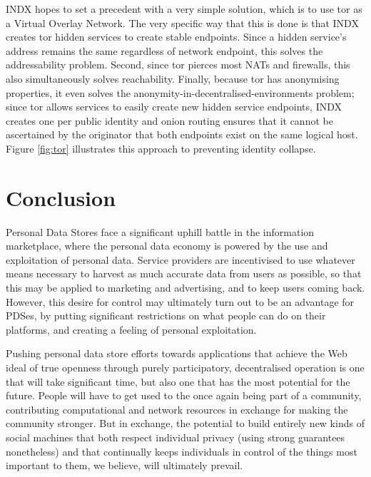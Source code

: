 \documentclass{sig-alternate}
\begin{document}
INDX hopes to set a precedent with a very simple solution, which is to use tor as a Virtual Overlay Network.  The very specific way that this is done is that INDX creates tor hidden services to create stable endpoints. Since a hidden service's address remains the same regardless of network endpoint, this solves the addressability problem. Second, since tor pierces most NATs and firewalls, this also simultaneously solves reachability.  Finally, because tor has anonymising properties, it even solves the anonymity-in-decentralised-environments problem; since tor allows services to easily create new  hidden service endpoints, INDX creates one per public identity and onion routing ensures that it cannot be ascertained by the originator that both endpoints exist on the same logical host. Figure \ref{fig:tor} illustrates this approach to preventing identity collapse.




\section{Conclusion}

Personal Data Stores face a significant uphill battle in the information marketplace, where the personal data economy is powered by the use and exploitation of personal data.  Service providers are incentivised to use whatever means necessary to harvest as much accurate data from users as possible, so that this may be applied to marketing and advertising, and to keep users coming back.  However, this desire for control may ultimately turn out to be an advantage for PDSes, by putting significant restrictions on what people can do on their platforms, and creating a feeling of personal exploitation.

Pushing personal data store efforts towards applications that achieve the Web ideal of true openness through purely participatory, decentralised operation is one that will take significant time, but also one that has the most potential for the future. People will have to get used to the once again being part of a community, contributing computational and network resources in exchange for making the community stronger.  But in exchange, the potential to build entirely new kinds of social machines that both respect individual privacy (using strong guarantees nonetheless) and that continually keeps individuals in control of the things most important to them, we believe, will ultimately prevail.  
\end{document}
